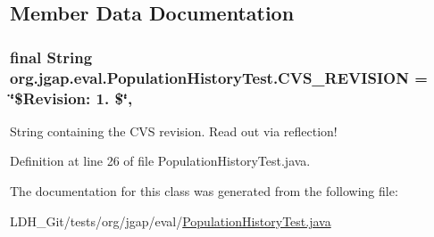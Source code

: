 \subsection{Member Data Documentation}
\hypertarget{classorg_1_1jgap_1_1eval_1_1_population_history_test_afbebd0d29e7588a50658034e1a7f7c80}{
\subsubsection[{C\-V\-S\-\_\-\-R\-E\-V\-I\-S\-I\-O\-N}]{\setlength{\rightskip}{0pt plus 5cm}final String org.\-jgap.\-eval.\-Population\-History\-Test.\-C\-V\-S\-\_\-\-R\-E\-V\-I\-S\-I\-O\-N = \char`\"{}\$Revision\-: 1. \$\char`\"{}\hspace{0.3cm}{\ttfamily [static]}, {\ttfamily [private]}}}\label{classorg_1_1jgap_1_1eval_1_1_population_history_test_afbebd0d29e7588a50658034e1a7f7c80}
String containing the C\-V\-S revision. Read out via reflection! 

Definition at line 26 of file Population\-History\-Test.\-java.



The documentation for this class was generated from the following file\-:\begin{DoxyCompactItemize}
\item 
L\-D\-H\-\_\-\-Git/tests/org/jgap/eval/\hyperlink{_population_history_test_8java}{Population\-History\-Test.\-java}\end{DoxyCompactItemize}
